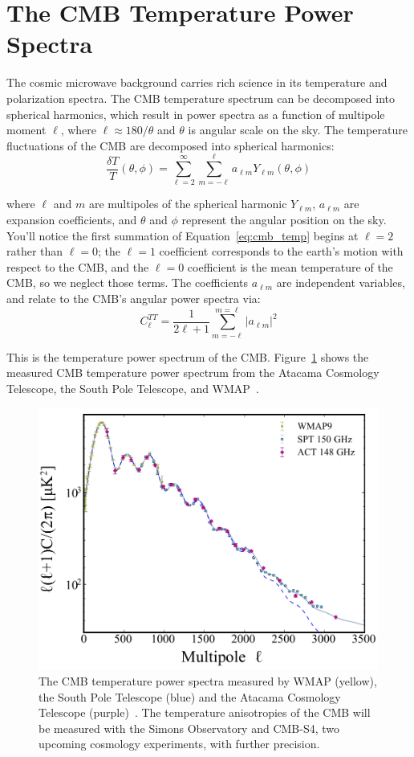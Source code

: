\section{The CMB Temperature Power Spectra}
The cosmic microwave background carries rich science in its temperature and polarization spectra.  The CMB temperature spectrum can be decomposed into spherical harmonics, which result in power spectra as a function of multipole moment $\ell$, where $\ell\approx180/\theta$ and $\theta$ is angular scale on the sky.  The temperature fluctuations of the CMB are decomposed into spherical harmonics:
\begin{equation}
\frac{\delta T}{T}(\theta,\phi) = \sum_{\ell=2}^{\infty} \sum_{m=-\ell}^{\ell} a_{\ell m} Y_{\ell m}(\theta,\phi)
    \label{eq:cmb_temp}
\end{equation}

where $\ell$ and $m$ are multipoles of the spherical harmonic $Y_{\ell m}$, $a_{\ell m}$ are expansion coefficients, and $\theta$ and $\phi$ represent the angular position on the sky.  You'll notice the first summation of Equation~\ref{eq:cmb_temp} begins at $\ell=2$ rather than $\ell=0$; the $\ell=1$ coefficient corresponds to the earth's motion with respect to the CMB, and the $\ell=0$ coefficient is the mean temperature of the CMB, so we neglect those terms.  The coefficients $a_{\ell m}$ are independent variables, and relate to the CMB's angular power spectra via:
\begin{equation}
    C_\ell^{TT} = \frac{1}{2\ell +1} \sum_{m=-\ell}^{m=\ell} |a_{\ell m}|^2
\end{equation}

This is the temperature power spectrum of the CMB.  Figure~\ref{fig:measured_cmb_spec} shows the measured CMB temperature power spectrum from the Atacama Cosmology Telescope, the South Pole Telescope, and WMAP~\cite{Das_2014}.
\begin{figure}[t]
    \centering
    \includegraphics[width = .8\textwidth]{Figures/temp_power_spectrum.pdf}
    \caption{The CMB temperature power spectra measured by WMAP (yellow), the South Pole Telescope (blue) and the Atacama Cosmology Telescope (purple)~\cite{Das_2014}.  The temperature anisotropies of the CMB will be measured with the Simons Observatory and CMB-S4, two upcoming cosmology experiments, with further precision.}
    \label{fig:measured_cmb_spec}
\end{figure}

